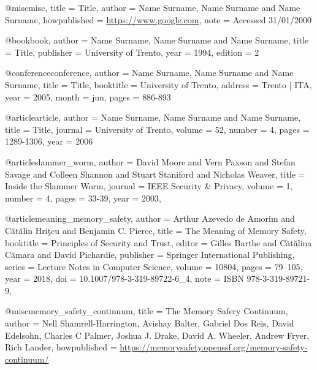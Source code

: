 @misc{misc,
  title = {{Title}},
  author = {{Name Surname, Name Surname and Name Surname}},
  howpublished = {\url{https://www.google.com}},
  note = {{Accessed 31/01/2000}}
}

@book{book,
  author = {{Name Surname, Name Surname and Name Surname}},
  title = {{Title}},
  publisher = {{University of Trento}},
  year = 1994,
  edition = 2
}

@conference{conference,
  author = {{Name Surname, Name Surname and Name Surname}},
  title = {{Title}},
  booktitle = {{University of Trento}},
  address = {{Trento | ITA}},
  year = 2005,
  month = jun,
  pages = {886-893}
}

@article{article,
  author = {{Name Surname, Name Surname and Name Surname}},
  title = {{Title}},
  journal = {{University of Trento}},
  volume = 52,
  number = 4,
  pages = {1289-1306},
  year = 2006
}

@article{slammer_worm,
  author = {{David Moore and Vern Paxson and Stefan Savage and Colleen Shannon and Stuart Staniford and Nicholas Weaver}},
  title = {{Inside the Slammer Worm}},
  journal = {{IEEE Security \& Privacy}},
  volume = 1,
  number = 4,
  pages = {33-39},
  year = 2003,
}

@article{meaning_memory_safety,
  author    = {Arthur Azevedo de Amorim and Cătălin Hriţcu and Benjamin C. Pierce},
  title     = {The Meaning of Memory Safety},
  booktitle = {Principles of Security and Trust},
  editor    = {Gilles Barthe and Cătălina Cămara and David Pichardie},
  publisher = {Springer International Publishing},
  series    = {Lecture Notes in Computer Science},
  volume    = {10804},
  pages     = {79--105},
  year      = {2018},
  doi       = {10.1007/978-3-319-89722-6_4},
  note      = {ISBN 978-3-319-89721-9},
}

@misc{memory_safety_continuum,
  title = {{The Memory Safery Continuum}},
  author = {{Nell Shamrell-Harrington, Avishay Balter, Gabriel Dos Reis, David Edelsohn, Charles C Palmer, Joshua J. Drake, David A. Wheeler, Andrew Fryer, Rich Lander}},
  howpublished = {\url{https://memorysafety.openssf.org/memory-safety-continuum/}}
}